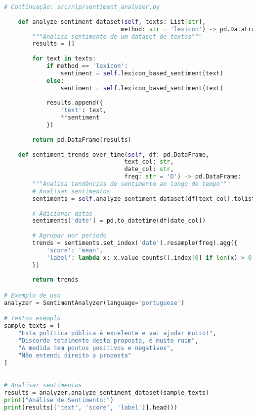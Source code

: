 \begin{pythonbox}
\begin{lstlisting}[language=Python]
# Continuação: src/nlp/sentiment_analyzer.py
    
    def analyze_sentiment_dataset(self, texts: List[str], 
                                 method: str = 'lexicon') -> pd.DataFrame:
        """Analisa sentimento de um dataset de textos"""
        results = []
        
        for text in texts:
            if method == 'lexicon':
                sentiment = self.lexicon_based_sentiment(text)
            else:
                sentiment = self.lexicon_based_sentiment(text)
                
            results.append({
                'text': text,
                **sentiment
            })
        
        return pd.DataFrame(results)
    
    def sentiment_trends_over_time(self, df: pd.DataFrame, 
                                  text_col: str, 
                                  date_col: str,
                                  freq: str = 'D') -> pd.DataFrame:
        """Analisa tendências de sentimento ao longo do tempo"""
        # Analisar sentimentos
        sentiments = self.analyze_sentiment_dataset(df[text_col].tolist())
        
        # Adicionar datas
        sentiments['date'] = pd.to_datetime(df[date_col])
        
        # Agrupar por período
        trends = sentiments.set_index('date').resample(freq).agg({
            'score': 'mean',
            'label': lambda x: x.value_counts().index[0] if len(x) > 0 else 'neutral'
        })
        
        return trends

# Exemplo de uso
analyzer = SentimentAnalyzer(language='portuguese')

# Textos exemplo
sample_texts = [
    "Esta política pública é excelente e vai ajudar muito!",
    "Discordo totalmente desta proposta, é muito ruim",
    "A medida tem pontos positivos e negativos",
    "Não entendi direito a proposta"
]

    \end{lstlisting}
\end{pythonbox}
\begin{pythonbox}
\begin{lstlisting}[language=Python]   

# Analisar sentimentos
results = analyzer.analyze_sentiment_dataset(sample_texts)
print("Análise de Sentimento:")
print(results[['text', 'score', 'label']].head())
\end{lstlisting}
\end{pythonbox}

